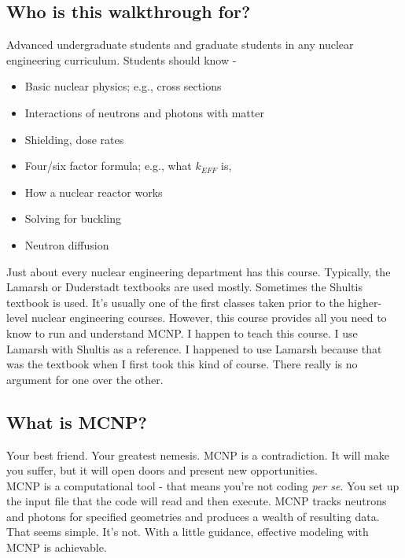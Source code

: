 \documentclass[11pt,a4paper]{article}
\begin{document}
\subsection{Who is this walkthrough for?}
\noindent Advanced undergraduate students and graduate students in any nuclear engineering curriculum. Students should know - 
\begin{itemize}[topsep=0pt,itemsep=-1ex,partopsep=1ex,parsep=1ex]
    \item Basic nuclear physics; e.g., cross sections
    \item Interactions of neutrons and photons with matter
    \item Shielding, dose rates
    \item Four/six factor formula; e.g., what $k_{EFF}$ is,
    \item How a nuclear reactor works
    \item Solving for buckling
    \item Neutron diffusion
\end{itemize}
\vspace*{\baselineskip}

\noindent Just about every nuclear engineering department has this course. Typically, the Lamarsh or Duderstadt textbooks are used mostly. Sometimes the Shultis textbook is used. It's usually one of the first classes taken prior to the higher-level nuclear engineering courses. However, this course provides all you need to know to run and understand MCNP. I happen to teach this course. I use Lamarsh with Shultis as a reference. I happened to use Lamarsh because that was the textbook when I first took this kind of course. There really is no argument for one over the other.

\subsection{What is MCNP?}
\noindent Your best friend. Your greatest nemesis. MCNP is a contradiction. It will make you suffer, but it will open doors and present new opportunities. \\

\noindent MCNP is a computational tool - that means you're not coding \textit{per se}. You set up the input file that the code will read and then execute. MCNP tracks neutrons and photons for specified geometries and produces a wealth of resulting data. That seems simple. It's not. With a little guidance, effective modeling with MCNP is achievable. 
\end{document}
